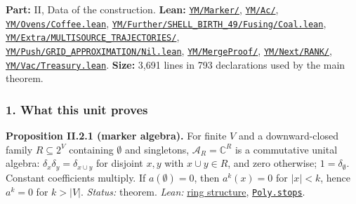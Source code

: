 \documentclass[
  letterpaper,
  11pt]{article}
\begin{document}
\textbf{Part:} II, Data of the construction. \textbf{Lean:}
\href{https://github.com/yang-mills-group/OpenAI-YM-20261028/tree/3456e5e75cf8d4cd558955a5c7638fba2d68f464/YM/Marker}{\texttt{YM/Marker/}},
\href{https://github.com/yang-mills-group/OpenAI-YM-20261028/tree/3456e5e75cf8d4cd558955a5c7638fba2d68f464/YM/Ac}{\texttt{YM/Ac/}},
\href{https://github.com/yang-mills-group/OpenAI-YM-20261028/blob/3456e5e75cf8d4cd558955a5c7638fba2d68f464/YM/Ovens/Coffee.lean}{\texttt{YM/Ovens/Coffee.lean}},
\href{https://github.com/yang-mills-group/OpenAI-YM-20261028/blob/3456e5e75cf8d4cd558955a5c7638fba2d68f464/YM/Further/SHELL_BIRTH_49/Fusing/Coal.lean}{\texttt{YM/Further/SHELL\_BIRTH\_49/Fusing/Coal.lean}},
\href{https://github.com/yang-mills-group/OpenAI-YM-20261028/tree/3456e5e75cf8d4cd558955a5c7638fba2d68f464/YM/Extra/MULTISOURCE_TRAJECTORIES}{\texttt{YM/Extra/MULTISOURCE\_TRAJECTORIES/}},
\href{https://github.com/yang-mills-group/OpenAI-YM-20261028/blob/3456e5e75cf8d4cd558955a5c7638fba2d68f464/YM/Push/GRID_APPROXIMATION/Nil.lean}{\texttt{YM/Push/GRID\_APPROXIMATION/Nil.lean}},
\href{https://github.com/yang-mills-group/OpenAI-YM-20261028/tree/3456e5e75cf8d4cd558955a5c7638fba2d68f464/YM/MergeProof}{\texttt{YM/MergeProof/}},
\href{https://github.com/yang-mills-group/OpenAI-YM-20261028/tree/3456e5e75cf8d4cd558955a5c7638fba2d68f464/YM/Next/RANK}{\texttt{YM/Next/RANK/}},
\href{https://github.com/yang-mills-group/OpenAI-YM-20261028/blob/3456e5e75cf8d4cd558955a5c7638fba2d68f464/YM/Vac/Treasury.lean}{\texttt{YM/Vac/Treasury.lean}}.
\textbf{Size:} 3,691 lines in 793 declarations used by the main theorem.

\subsubsection{1. What this unit proves}\label{what-this-unit-proves-2}

\textbf{Proposition II.2.1 (marker algebra).} For finite \(V\) and a
downward-closed family \(R\subseteq2^V\) containing \(\emptyset\) and
singletons, \(\mathcal A_R=\mathbb C^R\) is a commutative unital
algebra: \(\delta_x\delta_y=\delta_{x\cup y}\) for disjoint \(x,y\) with
\(x\cup y\in R\), and zero otherwise; \(1=\delta_\emptyset\). Constant
coefficients multiply. If \(a(\emptyset)=0\), then \(a^k(x)=0\) for
\(|x|<k\), hence \(a^k=0\) for \(k>|V|\). \emph{Status:} theorem.
\emph{Lean:}
\href{https://github.com/yang-mills-group/OpenAI-YM-20261028/blob/3456e5e75cf8d4cd558955a5c7638fba2d68f464/YM/Marker/Console.lean}{ring
structure},
\href{https://github.com/yang-mills-group/OpenAI-YM-20261028/blob/3456e5e75cf8d4cd558955a5c7638fba2d68f464/YM/Marker/Truncated.lean\#L26-L27}{\texttt{Poly.stops}}.
\end{document}

